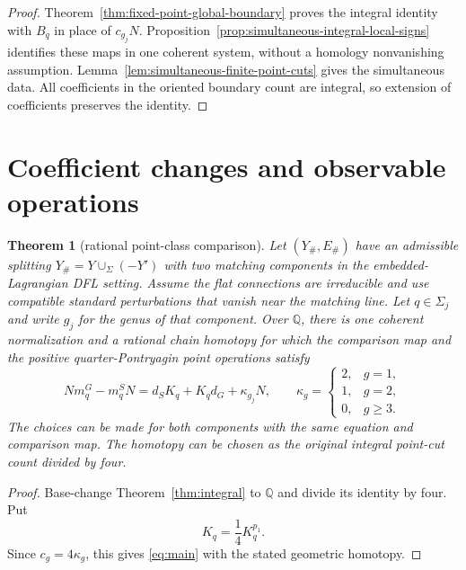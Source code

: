 \documentclass[11pt]{amsart}
\newtheorem{theorem}{Theorem}[section]
\theoremstyle{definition}
\theoremstyle{remark}
\theoremstyle{plain}
\newcommand{\QQ}{\mathbb{Q}}
\begin{document}
\begin{proof}
Theorem~\ref{thm:fixed-point-global-boundary}
proves the integral identity with $B_q$ in place of
$c_{g_j}N$. Proposition~\ref{prop:simultaneous-integral-local-signs}
identifies these maps in one coherent system, without
a homology nonvanishing assumption.
Lemma~\ref{lem:simultaneous-finite-point-cuts}
gives the simultaneous data. All coefficients in
the oriented boundary count are integral, so
extension of coefficients preserves the identity.
\end{proof}

\section{Coefficient changes and observable operations}
\label{sec:integral}

\begin{theorem}[rational point-class comparison]\label{thm:main}
Let $(Y_\#,E_\#)$ have an admissible splitting
$Y_\#=Y\cup_\Sigma(-Y')$ with two matching components
in the embedded-Lagrangian DFL setting. Assume
the flat connections are irreducible and use compatible standard
perturbations that vanish near the matching line.  Let
$q\in\Sigma_j$ and write $g_j$ for the genus of that component.  Over
$\QQ$, there is one coherent normalization and a
rational chain homotopy for which the comparison map
and the positive quarter-Pontryagin point operations satisfy
\begin{equation}\label{eq:main}
 N m_q^G-m_q^S N
 =d_SK_q+K_qd_G+\kappa_{g_j}N,
 \qquad
 \kappa_g=
 \begin{cases}
 2,&g=1,\\
 1,&g=2,\\
 0,&g\geq3.
 \end{cases}
\end{equation}
The choices can be made for both components with the same
equation and comparison map. The homotopy can be chosen
as the original integral point-cut count divided by four.
\end{theorem}

\begin{proof}
Base-change Theorem~\ref{thm:integral} to $\QQ$ and divide
its identity by four. Put
\begin{equation}\label{eq:final-rational-homotopy}
                            K_q=\frac14K_q^{p_1}.
\end{equation}
Since $c_g=4\kappa_g$, this gives \eqref{eq:main}
with the stated geometric homotopy.
\end{proof}
\end{document}
